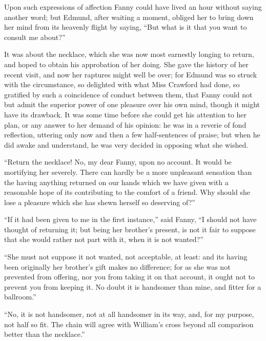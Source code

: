 \documentclass{article}
\begin{document}
Upon such expressions of affection Fanny could have
lived an hour without saying another word; but Edmund,
after waiting a moment, obliged her to bring down her
mind from its heavenly flight by saying, ``But what is it
that you want to consult me about?''

It was about the necklace, which she was now most earnestly
longing to return, and hoped to obtain his approbation
of her doing.  She gave the history of her recent visit,
and now her raptures might well be over; for Edmund was so
struck with the circumstance, so delighted with what Miss
Crawford had done, so gratified by such a coincidence
of conduct between them, that Fanny could not but admit
the superior power of one pleasure over his own mind,
though it might have its drawback.  It was some time
before she could get his attention to her plan, or any
answer to her demand of his opinion:  he was in a reverie
of fond reflection, uttering only now and then a few
half-sentences of praise; but when he did awake and understand,
he was very decided in opposing what she wished.

``Return the necklace!  No, my dear Fanny, upon no account.
It would be mortifying her severely.  There can hardly
be a more unpleasant sensation than the having anything
returned on our hands which we have given with a reasonable
hope of its contributing to the comfort of a friend.
Why should she lose a pleasure which she has shewn herself
so deserving of?''

``If it had been given to me in the first instance,''
said Fanny, ``I should not have thought of returning it;
but being her brother's present, is not it fair to suppose
that she would rather not part with it, when it is
not wanted?''

``She must not suppose it not wanted, not acceptable,
at least:  and its having been originally her brother's
gift makes no difference; for as she was not prevented
from offering, nor you from taking it on that account,
it ought not to prevent you from keeping it.  No doubt it
is handsomer than mine, and fitter for a ballroom.''

``No, it is not handsomer, not at all handsomer
in its way, and, for my purpose, not half so fit.
The chain will agree with William's cross beyond
all comparison better than the necklace.''
\end{document}
